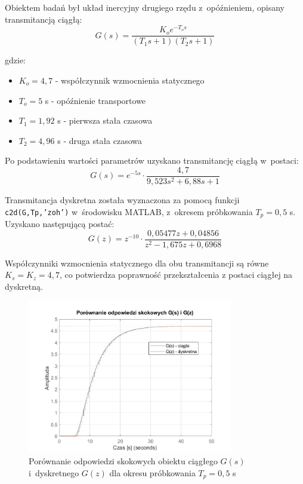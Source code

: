 \documentclass[a4paper,titlepage,11pt,floatssmall]{mwrep}
\begin{document}
Obiektem badań był układ inercyjny drugiego rzędu z~opóźnieniem, opisany transmitancją ciągłą:
\begin{equation}
    G(s) = \frac{K_o e^{-T_o s}}{(T_1 s + 1)(T_2 s + 1)}
\end{equation}

gdzie:
\begin{itemize}
    \item $K_o = 4,7$ - współczynnik wzmocnienia statycznego
    \item $T_o = 5$ s - opóźnienie transportowe
    \item $T_1 = 1,92$ s - pierwsza stała czasowa
    \item $T_2 = 4,96$ s - druga stała czasowa
\end{itemize}

Po podstawieniu wartości parametrów uzyskano transmitancję ciągłą w~postaci:
\begin{equation}
    G(s) = e^{-5s} \cdot \frac{4,7}{9,523s^2 + 6,88s + 1}
\end{equation}

Transmitancja dyskretna została wyznaczona za pomocą funkcji \texttt{c2d(G,Tp,'zoh')} w~środowisku MATLAB, z~okresem próbkowania $T_p = 0,5$ s. Uzyskano następującą postać:
\begin{equation}
    G(z) = z^{-10} \cdot \frac{0,05477z + 0,04856}{z^2 - 1,675z + 0,6968}
\end{equation}

Współczynniki wzmocnienia statycznego dla obu transmitancji są równe $K_s = K_z = 4,7$, co potwierdza poprawność przekształcenia z postaci ciągłej na dyskretną.

\begin{figure}[H]
    \centering
    \includegraphics[width=0.8\textwidth]{kod/wykresy/zad1.jpg}
    \caption{Porównanie odpowiedzi skokowych obiektu ciągłego $G(s)$ i~dyskretnego $G(z)$ dla okresu próbkowania $T_p = 0,5$ s}
    \label{fig:odp_skokowe}
\end{figure}
\end{document}
